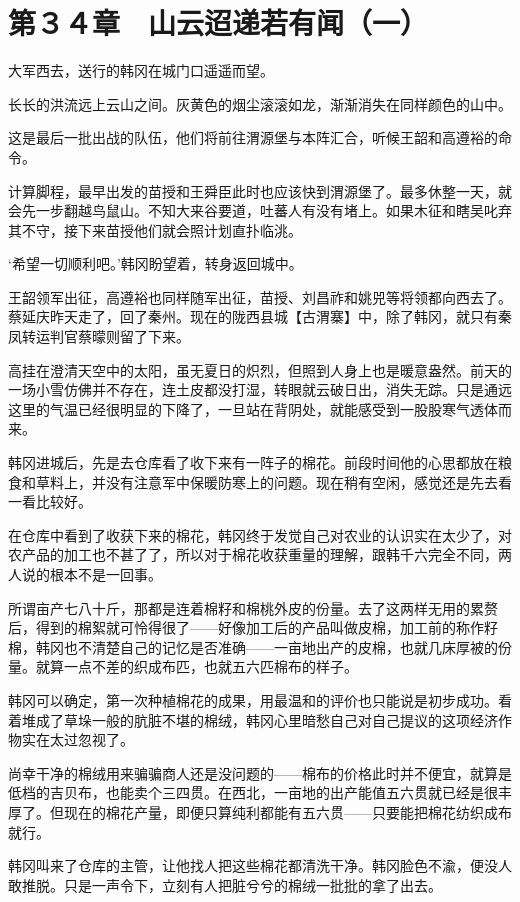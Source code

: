 \section{第３４章　山云迢递若有闻（一）}

大军西去，送行的韩冈在城门口遥遥而望。

长长的洪流远上云山之间。灰黄色的烟尘滚滚如龙，渐渐消失在同样颜色的山中。

这是最后一批出战的队伍，他们将前往渭源堡与本阵汇合，听候王韶和高遵裕的命令。

计算脚程，最早出发的苗授和王舜臣此时也应该快到渭源堡了。最多休整一天，就会先一步翻越鸟鼠山。不知大来谷要道，吐蕃人有没有堵上。如果木征和瞎吴叱弃其不守，接下来苗授他们就会照计划直扑临洮。

‘希望一切顺利吧。’韩冈盼望着，转身返回城中。

王韶领军出征，高遵裕也同样随军出征，苗授、刘昌祚和姚兕等将领都向西去了。蔡延庆昨天走了，回了秦州。现在的陇西县城【古渭寨】中，除了韩冈，就只有秦凤转运判官蔡曚则留了下来。

高挂在澄清天空中的太阳，虽无夏日的炽烈，但照到人身上也是暖意盎然。前天的一场小雪仿佛并不存在，连土皮都没打湿，转眼就云破日出，消失无踪。只是通远这里的气温已经很明显的下降了，一旦站在背阴处，就能感受到一股股寒气透体而来。

韩冈进城后，先是去仓库看了收下来有一阵子的棉花。前段时间他的心思都放在粮食和草料上，并没有注意军中保暖防寒上的问题。现在稍有空闲，感觉还是先去看一看比较好。

在仓库中看到了收获下来的棉花，韩冈终于发觉自己对农业的认识实在太少了，对农产品的加工也不甚了了，所以对于棉花收获重量的理解，跟韩千六完全不同，两人说的根本不是一回事。

所谓亩产七八十斤，那都是连着棉籽和棉桃外皮的份量。去了这两样无用的累赘后，得到的棉絮就可怜得很了——好像加工后的产品叫做皮棉，加工前的称作籽棉，韩冈也不清楚自己的记忆是否准确——一亩地出产的皮棉，也就几床厚被的份量。就算一点不差的织成布匹，也就五六匹棉布的样子。

韩冈可以确定，第一次种植棉花的成果，用最温和的评价也只能说是初步成功。看着堆成了草垛一般的肮脏不堪的棉绒，韩冈心里暗愁自己对自己提议的这项经济作物实在太过忽视了。

尚幸干净的棉绒用来骗骗商人还是没问题的——棉布的价格此时并不便宜，就算是低档的吉贝布，也能卖个三四贯。在西北，一亩地的出产能值五六贯就已经是很丰厚了。但现在的棉花产量，即便只算纯利都能有五六贯——只要能把棉花纺织成布就行。

韩冈叫来了仓库的主管，让他找人把这些棉花都清洗干净。韩冈脸色不渝，便没人敢推脱。只是一声令下，立刻有人把脏兮兮的棉绒一批批的拿了出去。

